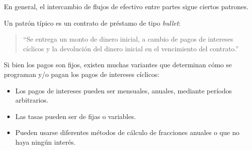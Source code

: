 \documentclass{beamer}
\begin{document}






\begin{frame}
    En general, el intercambio de flujos de efectivo entre partes sigue ciertos patrones. \pause

    Un patrón típico es un contrato de préstamo de tipo \textit{bullet}: \pause

    \medskip

    \begin{quote}
        ``Se entrega un monto de dinero inicial, a cambio de pagos de intereses cíclicos y la devolución del dinero inicial en el vencimiento del contrato.''
    \end{quote}
    \pause
    \medskip

    Si bien los pagos son fijos, existen muchas variantes que determinan cómo se programan y/o pagan los pagos de intereses cíclicos:
    \begin{itemize}
        \pause
        \item Los pagos de intereses pueden ser mensuales, anuales, mediante períodos arbitrarios. 
        \pause
        \item Las tasas pueden ser de fijas o variables.
        \pause
        \item Pueden usarse diferentes métodos de cálculo de fracciones anuales o que no haya ningún interés.
    \end{itemize}



\end{frame}
\end{document}
